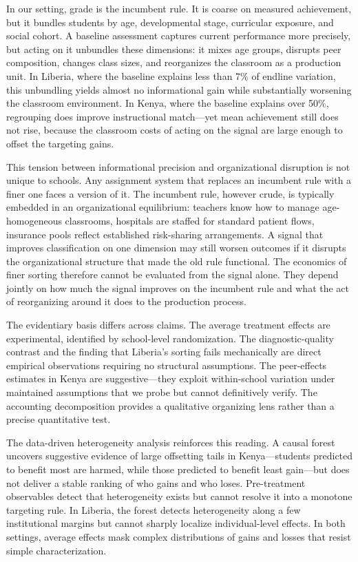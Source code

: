 \documentclass[11pt]{article}
\begin{document}
In our setting, grade is the incumbent rule. It is coarse on measured achievement, but it bundles students by age, developmental stage, curricular exposure, and social cohort. A baseline assessment captures current performance more precisely, but acting on it unbundles these dimensions: it mixes age groups, disrupts peer composition, changes class sizes, and reorganizes the classroom as a production unit. In Liberia, where the baseline explains less than 7\% of endline variation, this unbundling yields almost no informational gain while substantially worsening the classroom environment. In Kenya, where the baseline explains over 50\%, regrouping does improve instructional match---yet mean achievement still does not rise, because the classroom costs of acting on the signal are large enough to offset the targeting gains.

This tension between informational precision and organizational disruption is not unique to schools. Any assignment system that replaces an incumbent rule with a finer one faces a version of it. The incumbent rule, however crude, is typically embedded in an organizational equilibrium: teachers know how to manage age-homogeneous classrooms, hospitals are staffed for standard patient flows, insurance pools reflect established risk-sharing arrangements. A signal that improves classification on one dimension may still worsen outcomes if it disrupts the organizational structure that made the old rule functional. The economics of finer sorting therefore cannot be evaluated from the signal alone. They depend jointly on how much the signal improves on the incumbent rule and what the act of reorganizing around it does to the production process.

The evidentiary basis differs across claims. The average treatment effects are experimental, identified by school-level randomization. The diagnostic-quality contrast and the finding that Liberia's sorting fails mechanically are direct empirical observations requiring no structural assumptions. The peer-effects estimates in Kenya are suggestive---they exploit within-school variation under maintained assumptions that we probe but cannot definitively verify. The accounting decomposition provides a qualitative organizing lens rather than a precise quantitative test.

The data-driven heterogeneity analysis reinforces this reading. A causal forest uncovers suggestive evidence of large offsetting tails in Kenya---students predicted to benefit most are harmed, while those predicted to benefit least gain---but does not deliver a stable ranking of who gains and who loses. Pre-treatment observables detect that heterogeneity exists but cannot resolve it into a monotone targeting rule. In Liberia, the forest detects heterogeneity along a few institutional margins but cannot sharply localize individual-level effects. In both settings, average effects mask complex distributions of gains and losses that resist simple characterization.
\end{document}
